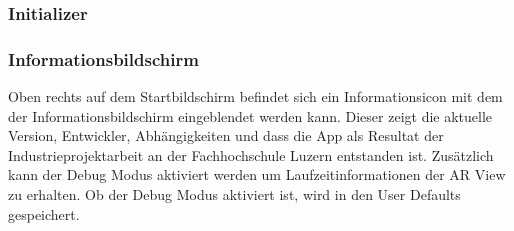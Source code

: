 \subsubsection{Initializer}

\subsubsection{Informationsbildschirm}
Oben rechts auf dem Startbildschirm befindet sich ein Informationsicon mit dem der Informationsbildschirm eingeblendet werden kann. Dieser zeigt die aktuelle Version, Entwickler, Abhängigkeiten und dass die App als Resultat der Industrieprojektarbeit an der Fachhochschule Luzern entstanden ist. Zusätzlich kann der Debug Modus aktiviert werden um Laufzeitinformationen der AR View zu erhalten. Ob der Debug Modus aktiviert ist, wird in den User Defaults gespeichert.
